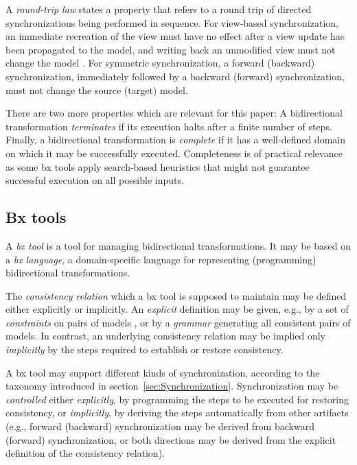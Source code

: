 A \emph{round-trip law} states a property that refers to a round trip of directed synchronizations being performed in sequence. 
For view-based synchronization, an immediate recreation of the view must have no effect after a view update has been propagated to the model, and writing back an unmodified view must not change the model \cite{TOPLAS2007-Foster}. 
For symmetric synchronization, a forward (backward) synchronization, immediately followed by a backward (forward) synchronization, must not change the source (target) model.

There are two more properties which are relevant for this paper: A bidirectional transformation \emph{terminates} if its execution halts after a finite number of steps. 
Finally, a bidirectional transformation is \emph{complete} if it has a well-defined domain on which it may be successfully executed.
Completeness is of practical relevance as some bx tools apply search-based heuristics that might not guarantee successful execution on all possible inputs.

\subsection{Bx tools}
\label{sec:BxTools}

A \emph{bx tool} is a tool for managing bidirectional transformations. It may be based on a \emph{bx language}, a domain-specific language for representing (programming) bidirectional transformations. 

The \emph{consistency relation} which a bx tool is supposed to maintain may be defined either explicitly or implicitly. An \emph{explicit} definition may be given, e.g., by a set of \emph{constraints} on pairs of models \cite{QVT-1.3}, or by a \emph{grammar} \cite{Schurr1994} generating all consistent pairs of models. 
In contrast, an underlying consistency relation may be implied only \emph{implicitly} by the steps required to establish or restore consistency.

A bx tool may support different kinds of synchronization, according to the taxonomy introduced in section~\ref{sec:Synchronization}. 
Synchronization may be \emph{controlled} either \emph{explicitly}, by programming the steps to be executed for restoring consistency, or \emph{implicitly}, by deriving the steps automatically from other artifacts (e.g., forward (backward) synchronization may be derived from backward (forward) synchronization, or both directions may be derived from the explicit definition of the consistency relation).

